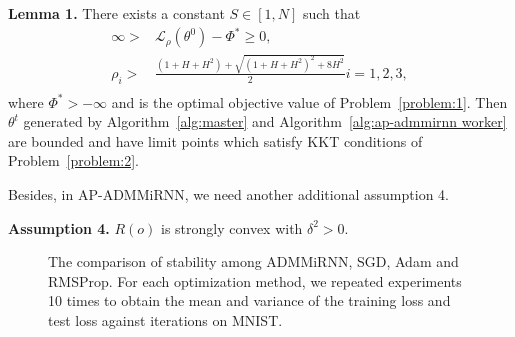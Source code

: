 \documentclass[twoside]{article}
\begin{document}
\begin{multicols}{2}
{\bf Lemma 1.} There exists a constant $S \in [1, N]$ such that 
\begin{equation}
    \begin{aligned}
        \infty > & \mathcal{L}_{\rho}(\theta^{0}) - \Phi^{*} \ge 0,\\
        \rho_i > & \frac{(1+H+H^2)+\sqrt{(1+H+H^2)^2+8H^2}}{2} i=1,2,3,\\
    \end{aligned}
\end{equation}
where $\Phi^{*} > -\infty$ and is the optimal objective value of Problem~\ref{problem:1}. Then $\theta^t$ generated by Algorithm~\ref{alg:master} and Algorithm~\ref{alg:ap-admmirnn worker} are bounded and have limit points which satisfy KKT conditions of Problem~\ref{problem:2}.

Besides, in AP-ADMMiRNN, we need another additional assumption 4.

{\bf Assumption 4.} $R(o)$ is strongly convex with $\delta^2 > 0$.
\begin{figure}[htbp]
\centering
{}
\caption{The comparison of stability among ADMMiRNN, SGD, Adam and RMSProp. For each optimization method, we repeated experiments 10 times to obtain the mean and variance of the training loss and test loss against iterations on MNIST.}\label{fig:errorbar}
\end{figure}


\end{multicols}
\end{document}
